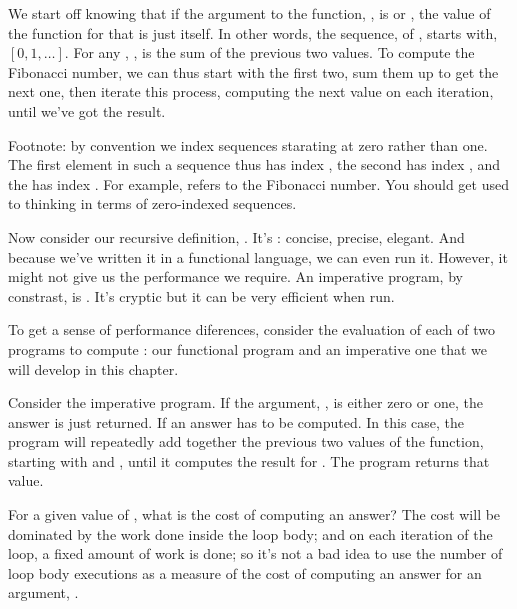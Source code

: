 \documentclass[letterpaper,10pt,english]{sphinxmanual}
\begin{document}
We start off knowing that if the argument to the function, , is 
or , the value of the function for that  is just  itself.  In
other words, the sequence,  of , starts with, \([0, 1, \ldots ]\).  For any , ,
is the sum of the previous two values.  To compute the 
Fibonacci number, we can thus start with the first two, sum them up to
get the next one, then iterate this process, computing the next value
on each iteration, until we’ve got the result.

Footnote: by convention we index sequences starating at zero rather
than one. The first element in such a sequence thus has index , the
second has index , and the  has index . For example,
 refers to the  Fibonacci number. You should get used to
thinking in terms of zero-indexed sequences.

Now consider our recursive definition, . It’s :
concise, precise, elegant.  And because we’ve written it in a
functional language, we can even run it. However, it might not give us
the performance we require. An imperative program, by constrast, is
. It’s cryptic but it can be very efficient when run.

To get a sense of performance diferences, consider the evaluation of
each of two programs to compute : our functional program and
an imperative one that we will develop in this chapter.

Consider the imperative program. If the argument, , is either zero
or one, the answer is just returned. If  an answer has to be
computed. In this case, the program will repeatedly add together the
previous two values of the function, starting with  and , until
it computes the result for .  The program returns that value.

For a given value of , what is the cost of computing an answer?
The cost will be dominated by the work done inside the loop body; and
on each iteration of the loop, a fixed amount of work is done; so it’s
not a bad idea to use the number of loop body executions as a measure
of the cost of computing an answer for an argument, .
\end{document}
